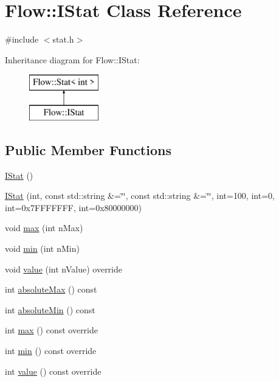 \hypertarget{class_flow_1_1_i_stat}{}\section{Flow\+:\+:I\+Stat Class Reference}
\label{class_flow_1_1_i_stat}


{\ttfamily \#include $<$stat.\+h$>$}

Inheritance diagram for Flow\+:\+:I\+Stat\+:\begin{figure}[H]
\begin{center}
\leavevmode
\includegraphics[height=2.000000cm]{class_flow_1_1_i_stat}
\end{center}
\end{figure}
\subsection*{Public Member Functions}
\begin{DoxyCompactItemize}
\item 
\hyperlink{class_flow_1_1_i_stat_ae9fdfde363f2c72f49cc12e6675b143d}{I\+Stat} ()
\item 
\hyperlink{class_flow_1_1_i_stat_ad6eb279e84ed220e438b61aba2a8f67e}{I\+Stat} (int, const std\+::string \&=\char`\"{}\char`\"{}, const std\+::string \&=\char`\"{}\char`\"{}, int=100, int=0, int=0x7\+F\+F\+F\+F\+F\+F\+F, int=0x80000000)
\item 
void \hyperlink{class_flow_1_1_i_stat_ac1606c768c151092154f67264fc19fe3}{max} (int n\+Max)
\item 
void \hyperlink{class_flow_1_1_i_stat_a386890208cdad8b89259692c9adfbf07}{min} (int n\+Min)
\item 
void \hyperlink{class_flow_1_1_i_stat_aff7abbcc9c44f1f07ed956f9d571c674}{value} (int n\+Value) override
\item 
int \hyperlink{class_flow_1_1_i_stat_a076fc64aee786d1f81bb709852bfc280}{absolute\+Max} () const
\item 
int \hyperlink{class_flow_1_1_i_stat_aa36a96f53fa8cfe2f3810a33f11b7b9e}{absolute\+Min} () const
\item 
int \hyperlink{class_flow_1_1_i_stat_afe5c49dcc98e7960bbc8d7064e7c831a}{max} () const override
\item 
int \hyperlink{class_flow_1_1_i_stat_a50cce8b3e14125d89165bce7cc9666ee}{min} () const override
\item 
int \hyperlink{class_flow_1_1_i_stat_a14a9ee1f7703cf474a12d07f334ab4a3}{value} () const override
\end{DoxyCompactItemize}
